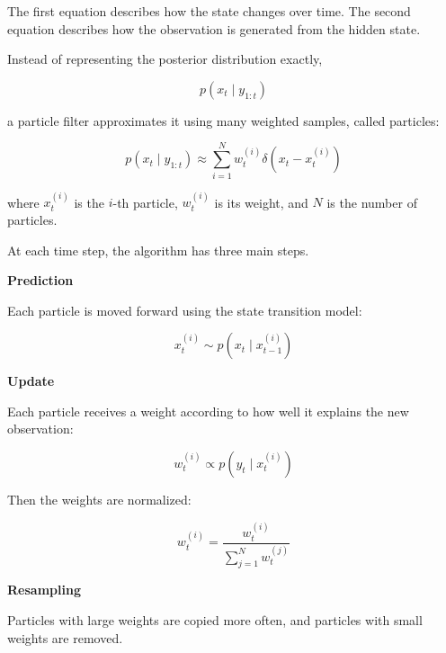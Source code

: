 \documentclass{book}
\providecommand{\ProjectDeepHeading}[2]{%
    \par\medskip\noindent\textbf{#2}\par\smallskip
}
\begin{document}
    The first equation describes how the state changes over time.
    The second equation describes how the observation is generated from the hidden state.
    
    Instead of representing the posterior distribution exactly,
    
    \begin{equation}
        p(x_t \mid y_{1:t})
    \end{equation}
    
    a particle filter approximates it using many weighted samples, called particles:
    
    \begin{equation}
        p(x_t \mid y_{1:t}) \approx \sum_{i=1}^{N} w_t^{(i)} \ensuremath{\delta}(x_t - x_t^{(i)})
    \end{equation}
    
    where $x_t^{(i)}$ is the $i$-th particle, $w_t^{(i)}$ is its weight, and $N$ is the number of particles.
    
    At each time step, the algorithm has three main steps.
    
    
    \ProjectDeepHeading{11}{Prediction}
        
        Each particle is moved forward using the state transition model:
        
        \begin{equation}
            x_t^{(i)} \sim p(x_t \mid x_{t-1}^{(i)})
        \end{equation}
    
    
    \ProjectDeepHeading{11}{Update}
        
        Each particle receives a weight according to how well it explains the new observation:
        
        \begin{equation}
            w_t^{(i)} \propto p(y_t \mid x_t^{(i)})
        \end{equation}
        
        Then the weights are normalized:
        
        \begin{equation}
            w_t^{(i)} =
            \frac{w_t^{(i)}}{\sum_{j=1}^{N} w_t^{(j)}}
        \end{equation}
    
    
    \ProjectDeepHeading{11}{Resampling}
        
        Particles with large weights are copied more often, and particles with small weights are removed.
        
\end{document}
